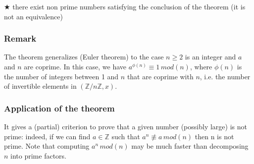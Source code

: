                \vspace{5pt}

                $\bigstar$ there exist non prime numbers satisfying the conclusion of the theorem (it is not an equivalence)

            \subsubsection{Remark}
                The theorem generalizes (Euler theorem) to the case $n \geq 2$ is an integer and $a$ and $n$ are coprime. In this case, we have $a^{\phi(n)} \equiv 1 \, mod(n)$, where $\phi(n)$ is the number of integers between 1 and $n$ that are coprime with $n$, i.e. the number of invertible elements in $(\mathbb{Z}/n\mathbb{Z}, x)$.

            \subsubsection{Application of the theorem}
                It gives a (partial) criterion to prove that a given number (possibly large) is not prime: indeed, if we can find $a \in \mathbb{Z}$ such that $a^n \not\equiv a \, mod(n)$ then n is not prime. Note that computing $a^n \, mod(n)$ may be much faster than decomposing $n$ into prime factors.